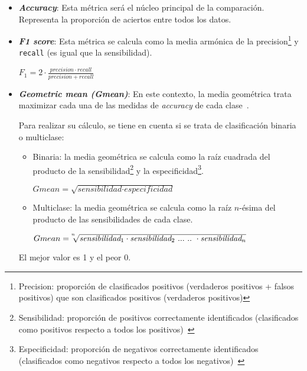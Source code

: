 \begin{itemize}
    \item \textit{\textbf{Accuracy}}: Esta métrica será el núcleo principal de
    la comparación. Representa la proporción de aciertos entre todos los datos.

    \item \textit{\textbf{F1 score}}: Esta métrica se calcula como la media
    armónica de la precision\footnote{Precision: proporción de clasificados
    positivos (verdaderos positivos + falsos positivos) que son clasificados
    positivos (verdaderos positivos)} y \texttt{recall} (es igual que la
    sensibilidad).

    \begin{center}
        $ F_1 = 2 \cdot \frac{precision \cdot recall}{precision + recall} $
    \end{center}

    \item \textit{\textbf{Geometric mean (Gmean)}}: En este contexto, la media
    geométrica trata maximizar cada una de las medidas de \emph{accuracy} de
    cada clase~\cite{imbalanced_learn}.

    Para realizar su cálculo, se tiene en cuenta si se trata de clasificación
    binaria o multiclase:
    \begin{itemize}
        \item Binaria: la media geométrica se calcula como la raíz cuadrada del
        producto de la sensibilidad\footnote{Sensibilidad: proporción de
        positivos correctamente identificados (clasificados como positivos
        respecto a todos los positivos)~\cite{eswiki:145396343}} y la
        especificidad\footnote{Especificidad: proporción de negativos
        correctamente identificados (clasificados como negativos respecto a
        todos los negativos)~\cite{eswiki:145396343}}.

        \begin{center}
            $ Gmean = \sqrt{\textit{sensibilidad} \cdot \textit{especificidad}} $
        \end{center}
        

        \item Multiclase: la media geométrica se calcula como la raíz $n$-ésima
        del producto de las sensibilidades de cada clase.

        \begin{center}
            $Gmean = \sqrt[\leftroot{5} \uproot{5} n]{\textit{sensibilidad}_1 \cdot
            \textit{sensibilidad}_2 ~...~..~\cdot \textit{sensibilidad}_n }$
        \end{center}
    \end{itemize}

    El mejor valor es 1 y el peor 0.
\end{itemize}

